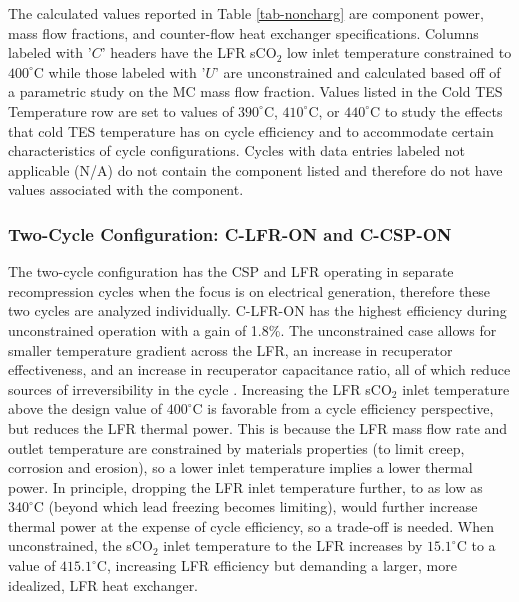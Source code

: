 \begin{paracol}{2}
\linenumbers
\switchcolumn

The calculated values reported in Table \ref{tab-noncharg} are component power, mass flow fractions, and counter-flow heat exchanger specifications. Columns labeled with '$C$' headers have the LFR sCO$_2$ low inlet temperature constrained to $400^{\circ}$C while those labeled with '$U$' are unconstrained and calculated based off of a parametric study on the MC mass flow fraction. Values listed in the Cold TES Temperature row are set to values of $390^{\circ}$C, $410^{\circ}$C, or $440^{\circ}$C to study the effects that cold TES temperature has on cycle efficiency and to accommodate certain characteristics of cycle configurations. Cycles with data entries labeled not applicable (N/A) do not contain the component listed and therefore do not have values associated with the component. 

\subsubsection{Two-Cycle Configuration: C-LFR-ON and C-CSP-ON}

The two-cycle configuration has the CSP and LFR operating in separate recompression cycles when the focus is on electrical generation, therefore these two cycles are analyzed individually. C-LFR-ON has the highest efficiency during unconstrained operation with a gain of 1.8\%. The unconstrained case allows for smaller temperature gradient across the LFR, an increase in recuperator effectiveness, and an increase in recuperator capacitance ratio, all of which reduce sources of irreversibility in the cycle \cite{klein_nellis_2011}. Increasing the LFR sCO$_2$ inlet temperature above the design value of $400^{\circ}$C is favorable from a cycle efficiency perspective, but reduces the LFR thermal power. This is because the LFR mass flow rate and outlet temperature are constrained by materials properties (to limit creep, corrosion and erosion), so a lower inlet temperature implies a lower thermal power. In principle, dropping the LFR inlet temperature further, to as low as $340^{\circ}$C (beyond which lead freezing becomes limiting), would further increase thermal power at the expense of cycle efficiency, so a trade-off is needed. When unconstrained, the sCO$_2$ inlet temperature to the LFR increases by $15.1^{\circ}$C to a value of $415.1^{\circ}$C, increasing LFR efficiency but demanding a larger, more idealized, LFR heat exchanger.


\end{paracol}
